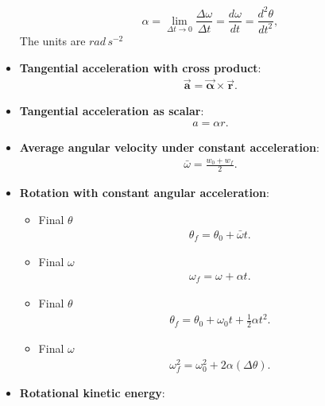 \documentclass{report}
\begin{document}
\begin{itemize}
\[                \alpha = \lim_{\Delta t \to 0} \frac{\Delta \omega}{\Delta t} = \frac{d\omega}{dt} = \frac{d^2\theta}{dt^2},
            \]
            The units are $rad\, s^{-2} $
        \item \textbf{Tangential acceleration with cross product}:
            \begin{align*}
                \vec{\mathbf{a}} = \vec{\mathbf{\alpha}} \times \vec{\mathbf{r}}
            .\end{align*}
        \item \textbf{Tangential acceleration as scalar}:
            \begin{align*}
                a = \alpha r
            .\end{align*}
        \item \textbf{Average angular velocity under constant acceleration}:
            \begin{align*}
                \bar{\omega} = \frac{w_{0} + w_{f}}{2}
            .\end{align*}
        \item \textbf{Rotation with constant angular acceleration}:
            \begin{itemize}
                \item Final $\theta$
                    \begin{align*}
                        \theta_{f} = \theta_{0} + \bar{\omega}t
                    .\end{align*}
                \item Final $\omega$
                    \begin{align*}
                        \omega_{f} = \omega_{} + \alpha t
                    .\end{align*}
                \item Final $\theta$
                    \begin{align*}
                        \theta_{f} = \theta_{0} + \omega_{0}t + \frac{1}{2}\alpha t^{2}
                    .\end{align*}
                \item Final $\omega$
                    \begin{align*}
                        \omega_{f}^{2} = \omega_{0}^{2} + 2\alpha(\Delta \theta )
                    .\end{align*}
            \end{itemize}
        \item \textbf{Rotational kinetic energy}:
            \begin{align*}

\end{align*}
\end{itemize}
\end{document}
